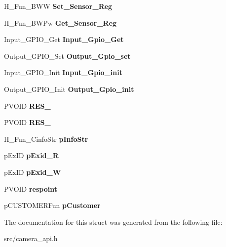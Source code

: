 \begin{DoxyCompactItemize}
H\+\_\+\+Fun\+\_\+\+B\+WW {\bfseries Set\+\_\+\+Sensor\+\_\+\+Reg}
\item 
\mbox{\label{struct___device___point___ae5c33e5dbbe75a06269a779b46f910e5}} 
H\+\_\+\+Fun\+\_\+\+B\+W\+Pw {\bfseries Get\+\_\+\+Sensor\+\_\+\+Reg}
\item 
\mbox{\label{struct___device___point___a693ba5a68484207ca9a4dcdb3099ee20}} 
Input\+\_\+\+G\+P\+I\+O\+\_\+\+Get {\bfseries Input\+\_\+\+Gpio\+\_\+\+Get}
\item 
\mbox{\label{struct___device___point___a2e3c1ab9e67f2f34d7f8b0201763d791}} 
Output\+\_\+\+G\+P\+I\+O\+\_\+\+Set {\bfseries Output\+\_\+\+Gpio\+\_\+set}
\item 
\mbox{\label{struct___device___point___ae626785c21cf9bc3fe9a80a849eb4eb7}} 
Input\+\_\+\+G\+P\+I\+O\+\_\+\+Init {\bfseries Input\+\_\+\+Gpio\+\_\+init}
\item 
\mbox{\label{struct___device___point___ac2ae81539bc4b84bf0aac9662f9f671a}} 
Output\+\_\+\+G\+P\+I\+O\+\_\+\+Init {\bfseries Output\+\_\+\+Gpio\+\_\+init}
\item 
\mbox{\label{struct___device___point___ab738d9836087a55b8cd6e7871459c3d0}} 
P\+V\+O\+ID {\bfseries R\+E\+S\+\_}
\item 
\mbox{\label{struct___device___point___a81f92aa0d840a974b6dc6fc63374edbc}} 
P\+V\+O\+ID {\bfseries R\+E\+S\+\_}
\item 
\mbox{\label{struct___device___point___ae8d95092c51baeefa9cd34d10a18c096}} 
H\+\_\+\+Fun\+\_\+\+Cinfo\+Str {\bfseries p\+Info\+Str}
\item 
\mbox{\label{struct___device___point___ad1b9669faa70672bff64d4df2474c957}} 
p\+Ex\+ID {\bfseries p\+Exid\+\_\+R}
\item 
\mbox{\label{struct___device___point___aba2eb95e2d194970a759807f8c92b7f0}} 
p\+Ex\+ID {\bfseries p\+Exid\+\_\+W}
\item 
\mbox{\label{struct___device___point___a91ad63e0cee2bee000daffefb913d887}} 
P\+V\+O\+ID {\bfseries respoint}
\item 
\mbox{\label{struct___device___point___a7bbbb8a7da07390894a0193fd46241d8}} 
p\+C\+U\+S\+T\+O\+M\+E\+R\+Fun {\bfseries p\+Customer}
\end{DoxyCompactItemize}


The documentation for this struct was generated from the following file\+:\begin{DoxyCompactItemize}
\item 
src/camera\+\_\+api.\+h\end{DoxyCompactItemize}
